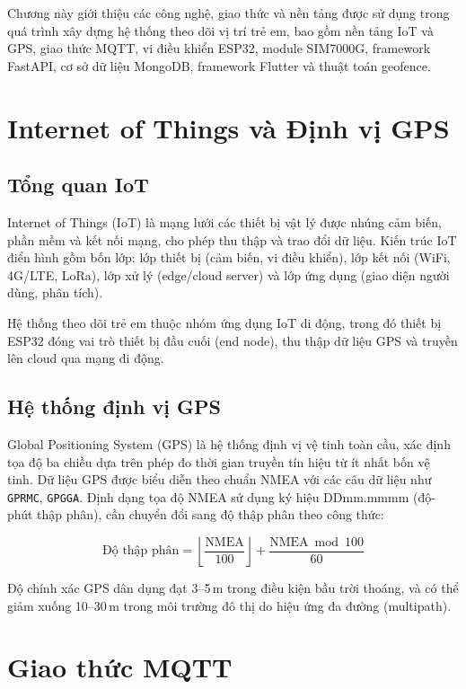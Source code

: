 \documentclass[../DoAn.tex]{subfiles}
\begin{document}
Chương này giới thiệu các công nghệ, giao thức và nền tảng được sử dụng trong quá trình xây dựng hệ thống theo dõi vị trí trẻ em, bao gồm nền tảng IoT và GPS, giao thức MQTT, vi điều khiển ESP32, module SIM7000G, framework FastAPI, cơ sở dữ liệu MongoDB, framework Flutter và thuật toán geofence.

\section{Internet of Things và Định vị GPS}

\subsection{Tổng quan IoT}

Internet of Things (IoT) là mạng lưới các thiết bị vật lý được nhúng cảm biến, phần mềm và kết nối mạng, cho phép thu thập và trao đổi dữ liệu. Kiến trúc IoT điển hình gồm bốn lớp: lớp thiết bị (cảm biến, vi điều khiển), lớp kết nối (WiFi, 4G/LTE, LoRa), lớp xử lý (edge/cloud server) và lớp ứng dụng (giao diện người dùng, phân tích).

Hệ thống theo dõi trẻ em thuộc nhóm ứng dụng IoT di động, trong đó thiết bị ESP32 đóng vai trò thiết bị đầu cuối (end node), thu thập dữ liệu GPS và truyền lên cloud qua mạng di động.

\subsection{Hệ thống định vị GPS}

Global Positioning System (GPS) là hệ thống định vị vệ tinh toàn cầu, xác định tọa độ ba chiều dựa trên phép đo thời gian truyền tín hiệu từ ít nhất bốn vệ tinh. Dữ liệu GPS được biểu diễn theo chuẩn NMEA với các câu dữ liệu như \texttt{GPRMC}, \texttt{GPGGA}. Định dạng tọa độ NMEA sử dụng ký hiệu DDmm.mmmm (độ-phút thập phân), cần chuyển đổi sang độ thập phân theo công thức:

\begin{equation}
  \text{Độ thập phân} = \left\lfloor \frac{\text{NMEA}}{100} \right\rfloor + \frac{\text{NMEA} \bmod 100}{60}
\end{equation}

Độ chính xác GPS dân dụng đạt 3--5\,m trong điều kiện bầu trời thoáng, và có thể giảm xuống 10--30\,m trong môi trường đô thị do hiệu ứng đa đường (multipath).

\section{Giao thức MQTT}
\end{document}
